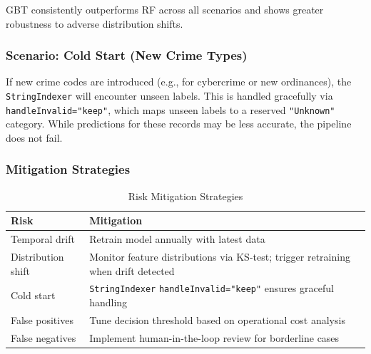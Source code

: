 GBT consistently outperforms RF across all scenarios and shows greater robustness to adverse distribution shifts.

\subsubsection{Scenario: Cold Start (New Crime Types)}

If new crime codes are introduced (e.g., for cybercrime or new ordinances), the \texttt{StringIndexer} will encounter unseen labels. This is handled gracefully via \texttt{handleInvalid="keep"}, which maps unseen labels to a reserved \texttt{"Unknown"} category. While predictions for these records may be less accurate, the pipeline does not fail.

\subsubsection{Mitigation Strategies}

\begin{table}[H]
\centering
\caption{Risk Mitigation Strategies}
\label{tab:mitigation}
\begin{tabularx}{\textwidth}{lX}
\toprule
\textbf{Risk} & \textbf{Mitigation} \\
\midrule
Temporal drift & Retrain model annually with latest data \\
Distribution shift & Monitor feature distributions via KS-test; trigger retraining when drift detected \\
Cold start & \texttt{StringIndexer} \texttt{handleInvalid="keep"} ensures graceful handling \\
False positives & Tune decision threshold based on operational cost analysis \\
False negatives & Implement human-in-the-loop review for borderline cases \\
\bottomrule
\end{tabularx}
\end{table}
